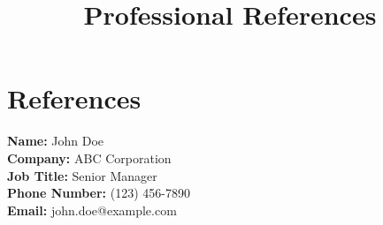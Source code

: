 \documentclass[a4paper, 12pt]{article}
\title{Professional References}
\date{}
\begin{document}
\maketitle

\section*{References}

\begin{description}
    \item  \textbf{Name:} John Doe  \\    \textbf{Company:} ABC Corporation \\
    \textbf{Job Title:} Senior Manager  \\
    \textbf{Phone Number:} (123) 456-7890  \\
    \textbf{Email:} john.doe@example.com
    
\end{description}
\end{document}
